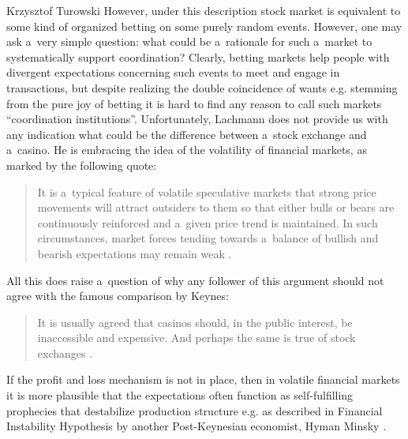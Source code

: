 \begin{artengenv}{Krzysztof Turowski}
However, under this description stock market is equivalent to some kind of organized betting on some purely random events.
However, one may ask a~very simple question: what could be a~rationale for such a~market to systematically support coordination?
Clearly, betting markets help people with divergent expectations concerning such events to meet and engage in transactions, but despite realizing the double coincidence of wants e.g. stemming from the pure joy of betting it is hard to find any reason to call such markets ``coordination institutions''.
Unfortunately, Lachmann does not provide us with any indication what could be the difference between a~stock exchange and a~casino.
He is embracing the idea of the volatility of financial markets, as marked by the following quote:
\begin{quote}
It is a~typical feature of volatile speculative markets that strong price movements will attract outsiders to them so that either bulls or bears are continuously reinforced and a~given price trend is maintained. In such circumstances, market forces tending towards a~balance of bullish and bearish expectations may remain weak \parencite[259]{lachmann-monetary}.
\end{quote}
All this does raise a~question of why any follower of this argument should not agree with the famous comparison by Keynes:
\begin{quote}
It is usually agreed that casinos should, in the public interest, be inaccessible and expensive. And perhaps the same is true of stock exchanges \parencite[159]{keynes-gt}.
\end{quote}
If the profit and loss mechanism is not in place, then in volatile financial markets it is more plausible that the expectations often function as self-fulfilling prophecies that destabilize production structure e.g. as described in Financial Instability Hypothesis by another Post-Keynesian economist, Hyman Minsky \parencite{minsky}.


\end{artengenv}
